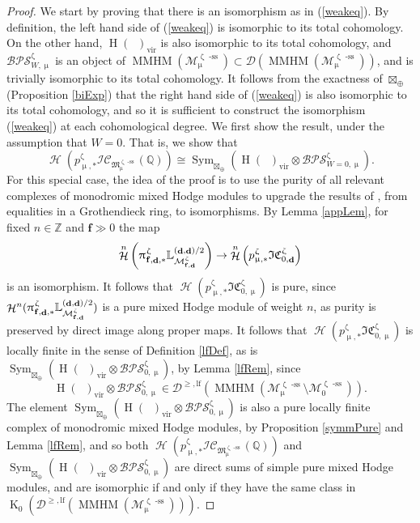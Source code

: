 \documentclass[a4paper,10pt]{amsart}
\renewcommand{\zeta}{\upzeta}
\renewcommand{\pi}{\uppi\hspace{0.05em}}
\renewcommand{\mu}{\upmu}
\DeclareMathOperator{\BC}{B\mathbb{C}^*}
\newcommand{\ff}{\mathbf{f}}
\newcommand{\LL}{\mathbb{L}}
\newcommand{\Mst}{\mathfrak{M}}
\newcommand{\Msp}{\mathcal{M}}
\newcommand{\ICS}{\mathcal{IC}}
\newcommand{\ICSt}{\mathfrak{IC}}
\newcommand{\DTS}{\mathcal{BPS}}
\DeclareMathOperator{\sst}{-ss}
\DeclareMathOperator{\FreeComm}{Sym}
\DeclareMathOperator{\MMHM}{MMHM}
\DeclareMathOperator{\Ka}{K}
\DeclareMathOperator{\dd}{\mathbf{d}}
\DeclareMathOperator{\vir}{vir}
\DeclareMathOperator{\Ho}{\mathcal{H}}
\DeclareMathOperator{\HO}{H}
\newcommand{\Dulf}{\mathcal{D}^{\geq, \mathrm{lf}}}
\newcommand{\Dub}{\mathcal{D}}
\begin{document}
\begin{proof}
We start by proving that there is an isomorphism as in (\ref{weakeq}).  By definition, the left hand side of (\ref{weakeq}) is isomorphic to its total cohomology.  On the other hand, $\HO(\BC )_{\vir}$ is also isomorphic to its total cohomology, and $\DTS_{W,\mu}^{\zeta}$ is an object of $\MMHM(\Msp_{\mu}^{\zeta\sst})\subset \Dub(\MMHM(\Msp_{\mu}^{\zeta\sst}))$, and is trivially isomorphic to its total cohomology.  It follows from the exactness of $\boxtimes_{\oplus}$ (Proposition \ref{biExp}) that the right hand side of (\ref{weakeq}) is also isomorphic to its total cohomology, and so it is sufficient to construct the isomorphism (\ref{weakeq}) at each cohomological degree.  
\smallbreak
We first show the result, under the assumption that $W=0$.  That is, we show that 
\[
\Ho(p^{\zeta}_{\mu,*}\ICS_{\Mst^{\zeta\sst}_{\mu}}(\mathbb{Q}))\cong\FreeComm_{\boxtimes_{\oplus}}(\HO(\BC )_{\vir}\otimes\DTS_{W=0,\mu}^{\zeta}).
\]
For this special case, the idea of the proof is to use the purity of all relevant complexes of monodromic mixed Hodge modules to upgrade the results of \cite{Meinhardt14}, from equalities in a Grothendieck ring, to isomorphisms.
\smallbreak
By Lemma \ref{appLem}, for fixed $n\in\mathbb{Z}$ and $\ff\gg 0$ the map 
\[
\Ho^n\left(\pi _{\ff,\dd ,*}^{\zeta}\LL^{(\dd,\dd)/2}_{\Msp_{\ff,\dd }^{\zeta}}\right)\rightarrow\Ho^n\left(p^{\zeta}_{\mu,*}\ICSt_{0,\dd}^{\zeta}\right)
\]
is an isomorphism.  It follows that $\Ho(p^{\zeta}_{\mu,*}\ICSt_{0,\mu}^{\zeta})$ is pure, since $\Ho^n(\pi _{\ff,\dd ,*}^{\zeta}\LL^{(\dd,\dd)/2}_{\Msp_{\ff,\dd }^{\zeta}})$ is a pure mixed Hodge module of weight $n$, as purity is preserved by direct image along proper maps.  It follows that $\Ho(p^{\zeta}_{\mu,*}\ICSt^{\zeta}_{0,\mu})$ is locally finite in the sense of Definition \ref{lfDef}, as is $\FreeComm_{\boxtimes_{\oplus}}(\HO(\BC )_{\vir}\otimes\DTS_{0,\mu}^{\zeta})$, by Lemma \ref{lfRem}, since 
\[
\HO(\BC )_{\vir}\otimes\DTS_{0,\mu}^{\zeta}\in\Dulf(\MMHM(\Msp_{\mu}^{\zeta\sst}\setminus\Msp^{\zeta\sst}_0)).  
\]
The element $\FreeComm_{\boxtimes_{\oplus}}(\HO(\BC )_{\vir}\otimes \DTS_{0,\mu}^{\zeta})$ is also a pure locally finite complex of monodromic mixed Hodge modules, by Proposition \ref{symmPure} and Lemma \ref{lfRem}, and so both $\Ho(p^{\zeta}_{\mu,*}\ICS_{\Mst^{\zeta\sst}_{\mu}}(\mathbb{Q}))$ and $\FreeComm_{\boxtimes_{\oplus}}(\HO(\BC )_{\vir}\otimes\DTS_{0,\mu}^{\zeta})$ are direct sums of simple pure mixed Hodge modules, and are isomorphic if and only if they have the same class in $\Ka_0(\Dulf(\MMHM(\Msp^{\zeta\sst}_{\mu})))$.  


\end{proof}
\end{document}
